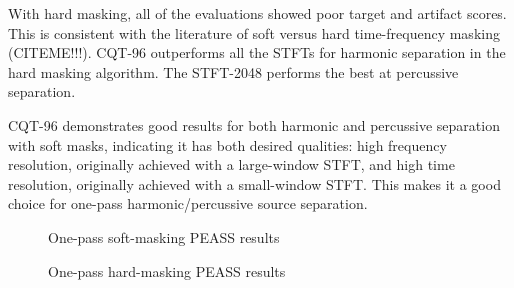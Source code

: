 \documentclass[10pt,letter]{article}
\begin{document}
With hard masking, all of the evaluations showed poor target and artifact scores. This is consistent with the literature of soft versus hard time-frequency masking (CITEME!!!). CQT-96 outperforms all the STFTs for harmonic separation in the hard masking algorithm. The STFT-2048 performs the best at percussive separation.

CQT-96 demonstrates good results for both harmonic and percussive separation with soft masks, indicating it has both desired qualities: high frequency resolution, originally achieved with a large-window STFT, and high time resolution, originally achieved with a small-window STFT. This makes it a good choice for one-pass harmonic/percussive source separation.

\begin{figure}
	\centering
	\vspace{-1.25em}
	\caption{One-pass soft-masking PEASS results}
	\label{fig:round1soft}
\end{figure}

\begin{figure}
	\centering
	\vspace{-1.25em}
	\caption{One-pass hard-masking PEASS results}
	\label{fig:round1hard}
\end{figure}
\end{document}
